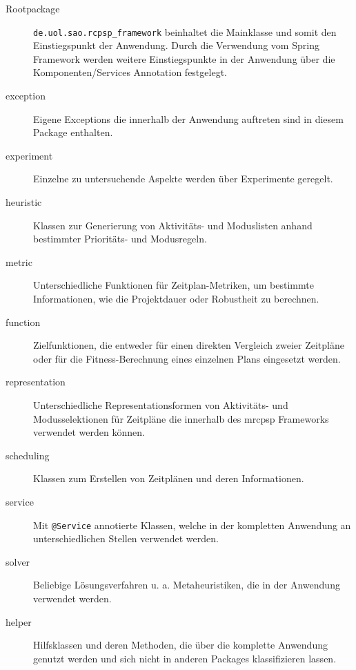 \begin{description}
\item[Rootpackage] \lstinline|de.uol.sao.rcpsp_framework| beinhaltet die Mainklasse und somit den Einstiegspunkt der Anwendung. Durch die Verwendung vom Spring Framework werden weitere Einstiegspunkte in der Anwendung über die Komponenten/Services Annotation festgelegt. 
\item[exception] Eigene Exceptions die innerhalb der Anwendung auftreten sind in diesem Package enthalten.
\item[experiment] Einzelne zu untersuchende Aspekte werden über Experimente geregelt.  
\item[heuristic] Klassen zur Generierung von Aktivitäts- und Moduslisten anhand bestimmter Prioritäts- und Modusregeln. 
\item[metric] Unterschiedliche Funktionen für Zeitplan-Metriken, um bestimmte Informationen, wie die Projektdauer oder Robustheit zu berechnen. 
\item[function] Zielfunktionen, die entweder für einen direkten Vergleich zweier Zeitpläne oder für die Fitness-Berechnung eines einzelnen Plans eingesetzt werden. 
\item[representation] Unterschiedliche Representationsformen von Aktivitäts- und Modusselektionen für Zeitpläne die innerhalb des \ac{mrcpsp} Frameworks verwendet werden können.
\item[scheduling] Klassen zum Erstellen von Zeitplänen und deren Informationen. 
\item[service] Mit \lstinline{@Service} annotierte Klassen, welche in der kompletten Anwendung an unterschiedlichen Stellen verwendet werden. 
\item[solver] Beliebige Lösungsverfahren u. a. Metaheuristiken, die in der Anwendung verwendet werden.
\item[helper] Hilfsklassen und deren Methoden, die über die komplette Anwendung genutzt werden und sich nicht in anderen Packages klassifizieren lassen. 

\end{description}

